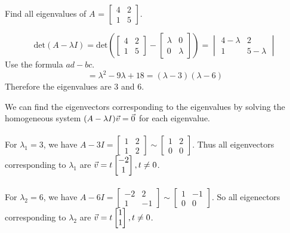\documentclass[english, 12pt]{article}
\begin{document}
\begin{exmp}
Find all eigenvalues of $A$ = $\begin{bmatrix} 4 & 2 \\ 1 & 5 \end{bmatrix}$.

\begin{sol}
\[\text{det}(A - \lambda I) = \text{det}\left(\begin{bmatrix} 4 & 2 \\ 1 & 5 \end{bmatrix} - \begin{bmatrix} \lambda & 0 \\ 0 & \lambda \end{bmatrix}\right) = \begin{vmatrix} 4 - \lambda & 2 \\ 1 & 5 - \lambda \end{vmatrix}\]
Use the formula $ad - bc$.
\[= \lambda^2 - 9 \lambda + 18 = (\lambda - 3) (\lambda - 6)\]
Therefore the eigenvalues are $3$ and $6$.
\end{sol}
\end{exmp}

\begin{exmp}
We can find the eigenvectors corresponding to the eigenvalues by solving the homogeneous system $(A - \lambda I) \vec{v} = \vec{0}$ for each eigenvalue. \\\\
For $\lambda_1 = 3$, we have $A - 3I = \begin{bmatrix} 1 & 2 \\ 1 & 2 \end{bmatrix} \sim \begin{bmatrix} 1 & 2 \\ 0 & 0 \end{bmatrix}$. Thus all eigenvectors corresponding to $\lambda_1$ are $\vec{v} = t \begin{bmatrix} -2 \\ 1 \end{bmatrix}, t \neq 0$. \\\\
For $\lambda_2 = 6$, we have $A - 6I = \begin{bmatrix} -2 & 2 \\ 1 & -1 \end{bmatrix} \sim \begin{bmatrix} 1 & -1 \\ 0 & 0 \end{bmatrix}$. So all eigenectors corresponding to $\lambda_2$ are $\vec{v} = t \begin{bmatrix} 1 \\ 1 \end{bmatrix}, t \neq 0$.
\end{exmp}
\end{document}

